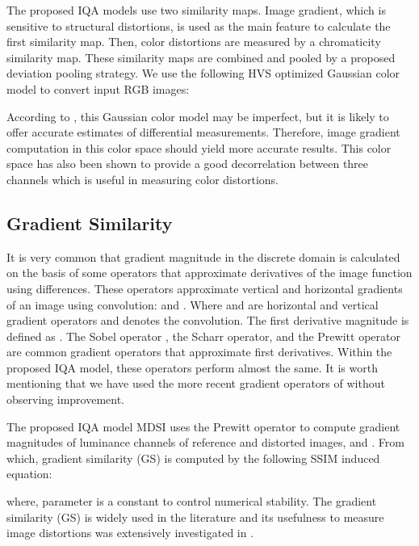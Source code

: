 The proposed IQA models use two similarity maps. Image gradient, which is sensitive to structural distortions, is used as the main feature to calculate the first similarity map. Then, color distortions are measured by a chromaticity similarity map. These similarity maps are combined and pooled by a proposed deviation pooling strategy. We use the following HVS optimized Gaussian color model to convert input RGB images:
 
According to \cite{invariance2001}, this Gaussian color model may be imperfect, but it is likely to offer accurate estimates of differential measurements. Therefore, image gradient computation in this color space should yield more accurate results. This color space has also been shown to provide a good decorrelation between three channels which is useful in measuring color distortions.    



\subsection{Gradient Similarity}


It is very common that gradient magnitude in the discrete domain is calculated on the basis of some operators that approximate derivatives of the image function using differences. These operators approximate vertical  and horizontal  gradients of an image  using convolution:  and . Where  and  are horizontal and vertical gradient operators and  denotes the convolution. The first derivative magnitude is defined as . The Sobel operator \cite{sobel}, the Scharr operator, and the Prewitt operator are common gradient operators that approximate first derivatives. Within the proposed IQA model, these operators perform almost the same. It is worth mentioning that we have used the more recent gradient operators of \cite{Farid} without observing improvement.     

The proposed IQA model MDSI uses the Prewitt operator to compute gradient magnitudes of luminance  channels of reference and distorted images,  and . From which, gradient similarity (GS) is computed by the following SSIM induced equation:
                    
where, parameter  is a constant to control numerical stability. The gradient similarity (GS) is widely used in the literature \cite{GSSIM, gradient2010, GS, FSIM, GMSD, VSI} and its usefulness to measure image distortions was extensively investigated in \cite{GMSD}. 




